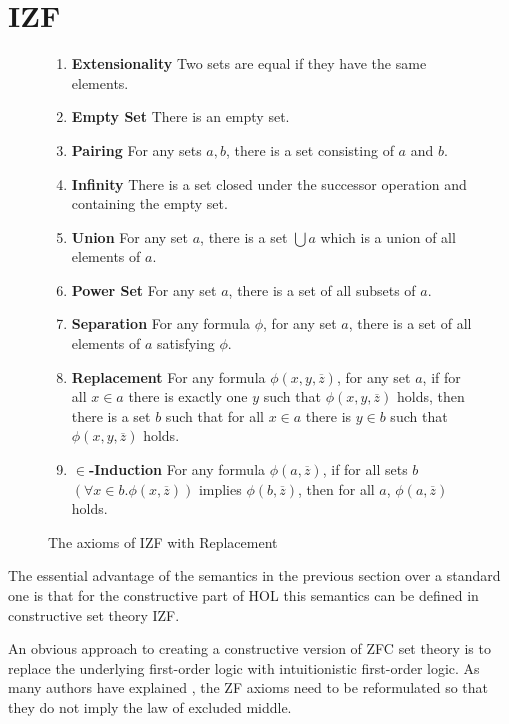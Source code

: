 \documentclass{LMCS}
\newcommand{\ov}[1]{\ensuremath{\overline{#1}}}
\newcommand{\izfax}[1]{{\bf #1}}
\begin{document}
\section{IZF}\label{izf}

\begin{figure}[t]\label{f1}
\begin{enumerate}[$\bullet$]
\item \izfax{Extensionality} Two sets are equal if they have the same elements. 
\item \izfax{Empty Set} There is an empty set.
\item \izfax{Pairing} For any sets $a, b$, there is a set consisting of $a$ and $b$.
\item \izfax{Infinity} There is a set closed under the successor operation
and containing the empty set. 
\item \izfax{Union} For any set $a$, there is a set $\bigcup a$ which is a union of all elements of $a$.
\item \izfax{Power Set} For any set $a$, there is a set of all subsets of $a$.
\item \izfax{Separation} For any formula $\phi$, for any set $a$, there is a set of all elements of
$a$ satisfying $\phi$. 
\item \izfax{Replacement} For any formula $\phi(x, y, \ov{z})$, for any set $a$, if for all $x \in a$ there is
exactly one $y$ such that $\phi(x, y, \ov{z})$ holds, then there is a set $b$ such that
for all $x \in a$ there is $y \in b$ such that $\phi(x, y, \ov{z})$ holds.
\item \izfax{$\in$-Induction} For any formula $\phi(a, \ov{z})$, if for all sets $b$ 
$(\forall x \in b. \phi(x, \ov{z}))$ implies $\phi(b, \ov{z})$, then for all
$a$, $\phi(a, \ov{z})$ holds. 
\end{enumerate}
\caption{The axioms of IZF with Replacement}
\end{figure}


The essential advantage of the semantics in the previous section over
a standard one is that for the constructive part of HOL this semantics can be
defined in constructive set theory IZF.

An obvious approach to creating a constructive version of ZFC set theory is
to replace the underlying first-order logic with intuitionistic first-order
logic. As many authors have explained \cite{Myhill73,Bee85,McCarty86,Sce85}, the
ZF axioms need to be reformulated so that they do not imply the law of excluded
middle.  
\end{document}
